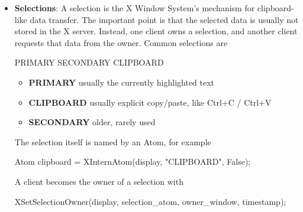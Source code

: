 \documentclass{report}
\begin{document}
\begin{itemize}
\begin{cppcode}
                XSetCloseDownMode (Display* display, int close_mode)
            \end{cppcode}
            \bigbreak \noindent
            \begin{itemize}
                \item \textbf{close\_mode}: close\_mode Specifies the client close-down mode. You can pass \textbf{DestroyAll,} \textbf{RetainPermanent,} or \textbf{RetainTemporary.}
            \end{itemize}
            \bigbreak \noindent 
            The \textbf{XSetCloseDownMode} defines what will happen to the client’s resources at connection close. A connection starts in \textbf{DestroyAll} mode.
            \bigbreak \noindent 
            \textbf{XSetCloseDownMode} can generate a \textbf{BadValue} error.
        \item \textbf{Selections}: A selection is the X Window System’s mechanism for clipboard-like data transfer.
            \bigbreak \noindent 
            The important point is that the selected data is usually not stored in the X server. Instead, one client owns a selection, and another client requests that data from the owner.
            \bigbreak \noindent 
            Common selections are
            \bigbreak \noindent 
            \begin{cppcode}
            PRIMARY
            SECONDARY
            CLIPBOARD
            \end{cppcode}
            \bigbreak \noindent
            \begin{itemize}
                \item \textbf{PRIMARY}    usually the currently highlighted text
                \item \textbf{CLIPBOARD}  usually explicit copy/paste, like Ctrl+C / Ctrl+V
                \item \textbf{SECONDARY}  older, rarely used
            \end{itemize}
            The selection itself is named by an Atom, for example
            \bigbreak \noindent 
            \begin{cppcode}
            Atom clipboard = XInternAtom(display, "CLIPBOARD", False);
            \end{cppcode}
            \bigbreak \noindent 
            A client becomes the owner of a selection with
            \bigbreak \noindent 
            \begin{cppcode}
            XSetSelectionOwner(display, selection_atom, owner_window, timestamp);

\end{cppcode}
\end{itemize}
\end{document}
